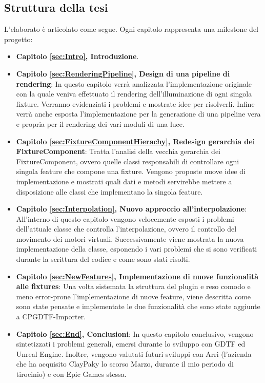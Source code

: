 \documentclass[main.tex]{subfiles}
\begin{document}
\subsection{Struttura della tesi}\label{subsec:1_thesisInfo}
L'elaborato è articolato come segue. Ogni capitolo rappresenta una milestone del progetto:
\begin{itemize}
    \item \textbf{Capitolo \ref{sec:Intro}, Introduzione}. %
    \item \textbf{Capitolo \ref{sec:RenderingPipeline}, Design di una pipeline di rendering}: In questo capitolo verrà analizzata l'implementazione originale con la quale veniva effettuato il rendering dell'illuminazione di ogni singola fixture. Verranno evidenziati i problemi e mostrate idee per risolverli. Infine verrà anche esposta l'implementazione per la generazione di una pipeline vera e propria per il rendering dei vari moduli di una luce. 
    \item \textbf{Capitolo \ref{sec:FixtureComponentHierachy}, Redesign gerarchia dei FixtureComponent}: Tratta l'analisi della vecchia gerarchia dei FixtureComponent, ovvero quelle classi responsabili di controllare ogni singola feature che compone una fixture. Vengono proposte nuove idee di implementazione e mostrati quali dati e metodi servirebbe mettere a disposizione alle classi che implementano la singola feature.
    \item \textbf{Capitolo \ref{sec:Interpolation}, Nuovo approccio all'interpolazione}: All'interno di questo capitolo vengono velocemente esposti i problemi dell'attuale classe che controlla l'interpolazione, ovvero il controllo del movimento dei motori virtuali. Successivamente viene mostrata la nuova implementazione della classe, esponendo i vari problemi che si sono verificati durante la scrittura del codice e come sono stati risolti.
    \item \textbf{Capitolo \ref{sec:NewFeatures}, Implementazione di nuove funzionalità alle fixtures}: Una volta sistemata la struttura del plugin e reso comodo e meno error-prone l'implementazione di nuove feature, viene descritta come sono state pensate e implementate le due funzionalità che sono state aggiunte a CPGDTF-Importer.
    \item \textbf{Capitolo \ref{sec:End}, Conclusioni}: In questo capitolo conclusivo, vengono sintetizzati i problemi generali, emersi durante lo sviluppo con GDTF ed Unreal Engine. Inoltre, vengono valutati futuri sviluppi con Arri (l'azienda che ha acquisito ClayPaky lo scorso Marzo, durante il mio periodo di tirocinio) e con Epic Games stessa.
\end{itemize}
\end{document}
